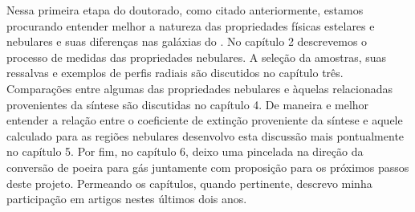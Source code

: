 Nessa primeira etapa do doutorado, como citado anteriormente, estamos procurando entender melhor a
natureza das propriedades físicas estelares e nebulares e suas diferenças nas galáxias do \PCAL. No
capítulo 2 descrevemos o processo de medidas das propriedades nebulares. A seleção da amostras, suas
ressalvas e exemplos de perfis radiais são discutidos no capítulo três. Comparações entre algumas
das propriedades nebulares e àquelas relacionadas provenientes da síntese são discutidas no capítulo
4. De maneira e melhor entender a relação entre o coeficiente de extinção proveniente da síntese e
aquele calculado para as regiões nebulares desenvolvo esta discussão mais pontualmente no capítulo
5. Por fim, no capítulo 6, deixo uma pincelada na direção da conversão de poeira para gás juntamente
com proposição para os próximos passos deste projeto. Permeando os capítulos, quando pertinente,
descrevo minha participação em artigos nestes últimos dois anos.

